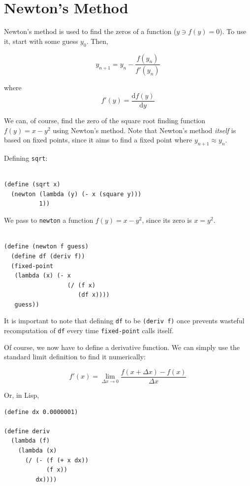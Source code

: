 \documentclass[9pt]{report}
\begin{document}
\section{Newton's Method}
\label{sec:org7f3a90d}

Newton's method is used to find the zeros of a function (\(y \ni
   f(y)=0\)). To use it, start with some guess \(y_0\). Then,

$$y_{n+1} = y_n - \frac{f(y_n)}{f'(y_n)}$$

where $$f'(y) = \frac{\mathrm{d}f(y)}{\mathrm{d}y}$$

We can, of course, find the zero of the square root finding function
\(f(y) =  x-y^2\) using Newton's method. Note that Newton's method
\emph{itself} is based on fixed points, since it aims to find a fixed
point where \(y_{n+1}\approx y_n\).

Defining \texttt{sqrt}:

\begin{verbatim}

(define (sqrt x)
  (newton (lambda (y) (- x (square y)))
          1))
\end{verbatim}

We pass to \texttt{newton} a function \(f(y)=x-y^2\), since its zero is \(x=y^2\).

\begin{verbatim}

(define (newton f guess)
  (define df (deriv f))
  (fixed-point
   (lambda (x) (- x
                  (/ (f x)
                     (df x))))
   guess))
\end{verbatim}


It is important to note that defining \texttt{df} to be \texttt{(deriv f)} once
prevents wasteful recomputation of \texttt{df} every time \texttt{fixed-point}
calls itself.

Of course, we now have to define a derivative function. We can
simply use the standard limit definition to find it numerically:

$$f'(x) = \lim_{\Delta x\to 0} \frac{f(x+\Delta x) - f(x)}{\Delta
   x}$$

Or, in Lisp,

\begin{verbatim}
(define dx 0.0000001)

(define deriv
  (lambda (f)
    (lambda (x)
      (/ (- (f (+ x dx))
            (f x))
         dx))))


\end{verbatim}
\end{document}
